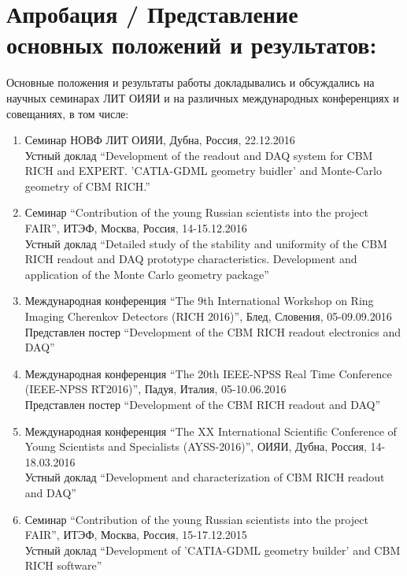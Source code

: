 \section*{Апробация / Представление основных положений и результатов:\todo}


Основные положения и результаты работы докладывались и обсуждались на научных семинарах ЛИТ ОИЯИ и на различных международных конференциях и совещаниях, в том числе:

\begin{enumerate}

\item Семинар НОВФ ЛИТ ОИЯИ, Дубна, Россия, 22.12.2016 \\
Устный доклад ``Development of the readout and DAQ system for CBM RICH and EXPERT. 'CATIA-GDML geometry buidler' and Monte-Carlo geometry of CBM RICH.''

\item Семинар ``Contribution of the young Russian scientists into the project FAIR'', ИТЭФ, Москва, Россия, 14-15.12.2016 \\
Устный доклад ``Detailed study of the stability and uniformity of the CBM RICH readout and DAQ prototype characteristics. Development and application of the Monte Carlo geometry package''

\item Международная конференция ``The 9th International Workshop on Ring Imaging Cherenkov Detectors (RICH 2016)'', Блед, Словения, 05-09.09.2016 \\
Представлен постер ``Development of the CBM RICH readout electronics and DAQ''

\item Международная конференция ``The 20th IEEE-NPSS Real Time Conference (IEEE-NPSS RT2016)'', Падуя, Италия, 05-10.06.2016 \\
Представлен постер ``Development of the CBM RICH readout and DAQ''

\item Международная конференция ``The XX International Scientific Conference of Young Scientists and Specialists (AYSS-2016)'', ОИЯИ, Дубна, Россия, 14-18.03.2016 \\
Устный доклад ``Development and characterization of CBM RICH readout and DAQ''

\item Семинар ``Contribution of the young Russian scientists into the project FAIR'', ИТЭФ, Москва, Россия, 15-17.12.2015 \\
Устный доклад ``Development of 'CATIA-GDML geometry builder' and CBM RICH software''


\end{enumerate}
